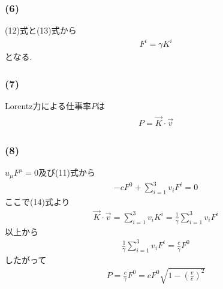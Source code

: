 \documentclass[uplatex,a4j,11pt,dvipdfmx]{jsarticle}
\begin{document}
\subsubsection*{(6)}
(12)式と(13)式から
\begin{align}
  F^i=\gamma K^i
\end{align}
となる.
\subsubsection*{(7)}
Lorentz力による仕事率$P$は
\begin{align}
  \begin{split}
    P=\vec{K}\cdot\vec{v}
  \end{split}
\end{align}
\subsubsection*{(8)}
$u_\mu F^\mu=0$及び(11)式から
\begin{align}
  -cF^0+\sum_{i=1}^3v_iF^i=0
\end{align}
ここで(14)式より
\begin{align}
  \vec{K}\cdot\vec{v}=\sum_{i=1}^3v_iK^i=\frac{1}{\gamma}\sum_{i=1}^3v_iF^i
\end{align}
以上から
\begin{align}
  \frac{1}{\gamma}\sum_{i=1}^3v_iF^i=\frac{c}{\gamma}F^0
\end{align}
したがって
\begin{align}
  P=\frac{c}{\gamma}F^0=cF^0\sqrt{1-\left(\frac{v}{c}\right)^2}
\end{align}
\end{document}
